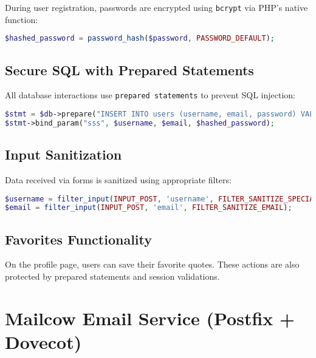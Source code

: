 \documentclass[12pt]{report}
\begin{document}
During user registration, passwords are encrypted using \texttt{bcrypt} via PHP's native function:

\begin{lstlisting}[language=php, caption={Password Hashing with bcrypt}]
$hashed_password = password_hash($password, PASSWORD_DEFAULT);
\end{lstlisting}

\subsection*{Secure SQL with Prepared Statements}

All database interactions use \texttt{prepared statements} to prevent SQL injection:

\begin{lstlisting}[language=php, caption={Insertion with Prepared Statement}]
$stmt = $db->prepare("INSERT INTO users (username, email, password) VALUES (?, ?, ?)");
$stmt->bind_param("sss", $username, $email, $hashed_password);
\end{lstlisting}

\subsection*{Input Sanitization}

Data received via forms is sanitized using appropriate filters:

\begin{lstlisting}[language=php, caption={Input Sanitization}]
$username = filter_input(INPUT_POST, 'username', FILTER_SANITIZE_SPECIAL_CHARS);
$email = filter_input(INPUT_POST, 'email', FILTER_SANITIZE_EMAIL);
\end{lstlisting}

\subsection*{Favorites Functionality}

On the profile page, users can save their favorite quotes. These actions are also protected by prepared statements and session validations.

\newpage
\section*{Mailcow Email Service (Postfix + Dovecot)}
\end{document}
